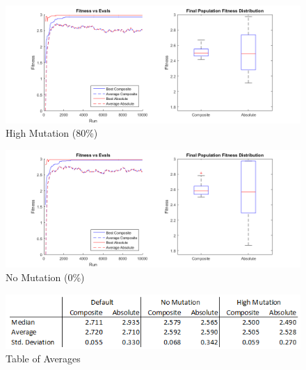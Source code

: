 \documentclass[11pt]{article}
\begin{document}
\begin{figure}[ht]
\centering
\includegraphics[width=6in]{high_mut.png}
\caption{High Mutation (80\%) }
\label{fig:graph_high_mut}
\end{figure}

\begin{figure}[ht]
\centering
\includegraphics[width=6in]{no_mut.png}
\caption{No Mutation (0\%)}
\label{fig:graph_no_mut}
\end{figure}

\begin{figure}[ht]
\centering
\includegraphics[width=4.5in]{avg_and_std_dev.png}
\caption{Table of Averages}
\label{fig:avg_table}
\end{figure}
\end{document}
